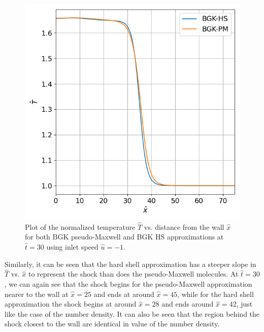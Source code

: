 \documentclass[a4paper]{article}
\begin{document}
\clearpage
\begin{figure}[hbt!]
    \centering
    \includegraphics[width=14cm]{plots/problem_e_T.png}
    \caption{\centering Plot of the normalized temperature $\hat{T}$ vs. distance from the wall $\hat{x}$ for both BGK pseudo-Maxwell and BGK HS approximations at $\hat{t} = 30$ using inlet speed $\hat{u} = -1$.}
    \label{problem_e_T}
\end{figure}
Similarly, it can be seen that the hard shell approximation has a steeper slope in $\hat{T}$ vs. $\hat{x}$ to represent the shock than does the pseudo-Maxwell molecules. At $\hat{t} = 30$, we can again see that the shock begins for the pseudo-Maxwell approximation nearer to the wall at $\hat{x} = 25$ and ends at around $\hat{x} = 45$, while for the hard shell approximation the shock begins at around $\hat{x} = 28$ and ends around $\hat{x}= 42$, just like the case of the number density. It can also be seen that the region behind the shock closest to the wall are identical in value of the number density.
\clearpage
\end{document}
